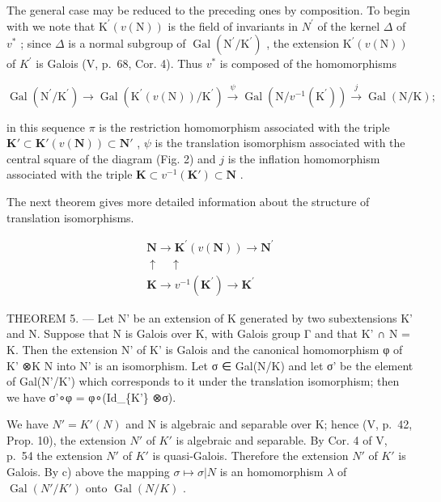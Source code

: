 The general case may be reduced to the preceding ones by composition. To begin with we note that \(\mathrm{K}^{\prime}(v(\mathrm{N}))\) is the field of invariants in \(N^{\prime}\) of the kernel \(\Delta\) of \(v^{*}\) ; since \(\Delta\) is a normal subgroup of \(\operatorname{Gal}(\mathrm{N}^{\prime}/\mathrm{K}^{\prime})\) , the extension \(\mathrm{K}^{\prime}(v(\mathrm{N}))\) of \(K^{\prime}\) is Galois (V, p.~68, Cor. 4). Thus \(v^{*}\) is composed of the homomorphisms

\[
\operatorname{Gal} \left(\mathrm{N} ^ {\prime} / \mathrm{K} ^ {\prime}\right)\rightarrow \operatorname{Gal} \left(\mathrm{K} ^ {\prime} (v (\mathrm{N})) / \mathrm{K} ^ {\prime}\right) \stackrel {{\psi}} {{\rightarrow}} \operatorname{Gal} \left(\mathrm{N} / v ^ {- 1} \left(\mathrm{K} ^ {\prime}\right)\right) \stackrel {{j}} {{\rightarrow}} \operatorname{Gal} (\mathrm{N} / \mathrm{K});
\]

in this sequence \(\pi\) is the restriction homomorphism associated with the triple \(\mathbf{K}' \subset \mathbf{K}'(v(\mathbf{N})) \subset \mathbf{N}'\) , \(\psi\) is the translation isomorphism associated with the central square of the diagram (Fig. 2) and \(j\) is the inflation homomorphism associated with the triple \(\mathbf{K} \subset v^{-1}(\mathbf{K}') \subset \mathbf{N}\) .

The next theorem gives more detailed information about the structure of translation isomorphisms.

\[
\begin{array}{c}\mathbf {N} \rightarrow \mathbf {K} ^ {\prime} (v (\mathbf {N})) \rightarrow \mathbf {N} ^ {\prime}\\\uparrow \quad \uparrow\\\mathbf {K} \rightarrow v ^ {- 1} (\mathbf {K} ^ {\prime}) \rightarrow \mathbf {K} ^ {\prime}\end{array}\tag {FIG.2.}
\]

THEOREM 5. --- Let N' be an extension of K generated by two subextensions K' and N. Suppose that N is Galois over K, with Galois group Γ and that K' ∩ N = K. Then the extension N' of K' is Galois and the canonical homomorphism φ of K' ⊗K N into N' is an isomorphism. Let σ ∈ Gal(N/K) and let σ' be the element of Gal(N'/K') which corresponds to it under the translation isomorphism; then we have σ'∘φ = φ∘(Id\_\{K'\} ⊗σ).

We have \(N' = K'(N)\) and N is algebraic and separable over K; hence (V, p.~42, Prop. 10), the extension \(N'\) of \(K'\) is algebraic and separable. By Cor. 4 of V, p.~54 the extension \(N'\) of \(K'\) is quasi-Galois. Therefore the extension \(N'\) of \(K'\) is Galois. By c) above the mapping \(\sigma \mapsto \sigma | N\) is an homomorphism \(\lambda\) of \(\operatorname{Gal}(N'/K')\) onto \(\operatorname{Gal}(N/K)\) .

